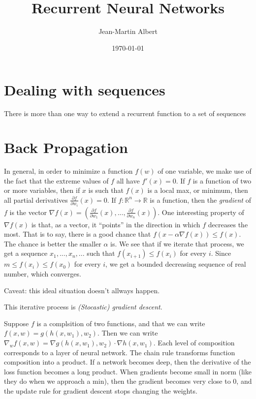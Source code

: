 \documentclass[10pt]{amsart}
\newcommand{\R}{\mathbb{R}}
\begin{document}
\title{Recurrent Neural Networks}
\author{Jean-Martin Albert}
\date{\today}
\maketitle

\section{Dealing with sequences}

There is more than one way to extend a recurrent function to a set of sequences

\section{Back Propagation}

In general, in order to minimize a function $f(w)$ of one variable, we make use of the fact that
the extreme values of $f$ all have $f'(x)=0$.  If $f$ is a function of two or more variables, then
if $x$ is such that $f(x)$ is a local max, or minimum, then all partial derivatives
$\frac{\partial f}{\partial w_i}(x)=0$.  If $f:\R^n\to\R$ is a function, then the
{\em gradient} of $f$ is the vector
$\nabla f(x) = \left(\frac{\partial f}{\partial w_1}(x),...,\frac{\partial f}{\partial w_n}(x)\right)$.
One interesting property of $\nabla f(x)$ is that, as a vector, it ``points'' in the direction in which
$f$ decreases the most.  That is to say, there is a good chance that $f(x-\alpha\nabla f(x))\leq f(x)$.
The chance is better the smaller $\alpha$ is.  We see that if we iterate that process, we get a
sequence $x_1,...,x_n,...$ such that $f(x_{i+1})\leq f(x_i)$ for every $i$.  Since $m\leq f(x_i)\leq f(x_0)$
for every $i$, we get a bounded decreasing sequence of real number, which converges.

Caveat: this ideal situation doesn't allways happen.

This iterative process is {\em (Stocastic) gradient descent}.

Suppose $f$ is a complsition of two functions, and that we can write $f(x,w)= g(h(x, w_1), w_2)$.
Then we can write $\nabla_w f(x, w)=\nabla g(h(x, w_1), w_2)\cdot \nabla h(x, w_1)$. Each level
of composition corresponds to a layer of neural network.  The chain rule transforms function composition
into a product. If a network becomes deep, then the derivative of the loss function becomes a long
product.  When gradients become small in norm (like they do when we approach a min), then the gradient
becomes very close to $0$, and the update rule for gradient descent stops changing the weights.
\end{document}
